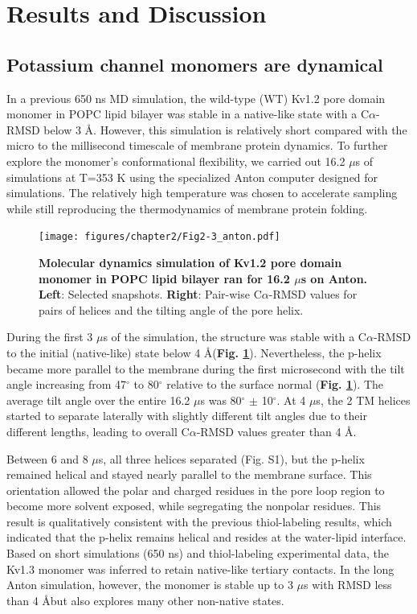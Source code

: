 \section{Results and Discussion}
\subsection{Potassium channel monomers are dynamical}
In a previous 650 ns MD simulation, the wild-type (WT) Kv1.2 pore domain monomer in POPC lipid bilayer was stable in a native-like state with a C$\alpha$-RMSD below 3 \AA. \cite{gajewski2011} However, this simulation is relatively short compared with the micro to the millisecond timescale of membrane protein dynamics. \citep{booth1995} To further explore the monomer’s conformational flexibility, we carried out 16.2 $\mu$s of simulations at T=353 K using the specialized Anton computer designed for simulations.\citep{shaw2009} The relatively high temperature was chosen to accelerate sampling while still reproducing the thermodynamics of membrane protein folding.

\begin{figure}[!ht]
\begin{center}
	\texttt{[image: figures/chapter2/Fig2-3\_anton.pdf]}
\end{center}
	\caption{\textbf{Molecular dynamics simulation of Kv1.2 pore domain monomer in POPC lipid bilayer ran for 16.2 $\mu$s on Anton.} \textbf{Left}: Selected snapshots. \textbf{Right}: Pair-wise C$\alpha$-RMSD values for pairs of helices and the tilting angle of the pore helix.}
	\label{fig:ch2_f3}
\end{figure}

During the first 3 $\mu$s of the simulation, the structure was stable with a C$\alpha$-RMSD to the initial (native-like) state below 4 \AA (\textbf{Fig. \ref{fig:ch2_f3}}). Nevertheless, the p-helix became more parallel to the membrane during the first microsecond with the tilt angle increasing from 47$^{\circ}$ to 80$^{\circ}$ relative to the surface normal (\textbf{Fig. \ref{fig:ch2_f3}}). The average tilt angle over the entire 16.2 $\mu$s was 80$^{\circ}$ $\pm$ 10$^{\circ}$. At 4 $\mu$s, the 2 TM helices started to separate laterally with slightly different tilt angles due to their different lengths, leading to overall C$\alpha$-RMSD values greater than 4 \AA. 

Between 6 and 8 $\mu$s, all three helices separated (Fig. S1), but the p-helix remained helical and stayed nearly parallel to the membrane surface. This orientation allowed the polar and charged residues in the pore loop region to become more solvent exposed, while segregating the nonpolar residues. This result is qualitatively consistent with the previous thiol-labeling results, which indicated that the p-helix remains helical and resides at the water-lipid interface. \citep{delaney2014} Based on short simulations (650 ns) and thiol-labeling experimental data, the Kv1.3 monomer was inferred to retain native-like tertiary contacts. \citep{gajewski2011} In the long Anton simulation, however, the monomer is stable up to 3 $\mu$s with RMSD less than 4 \AA but also explores many other non-native states.

